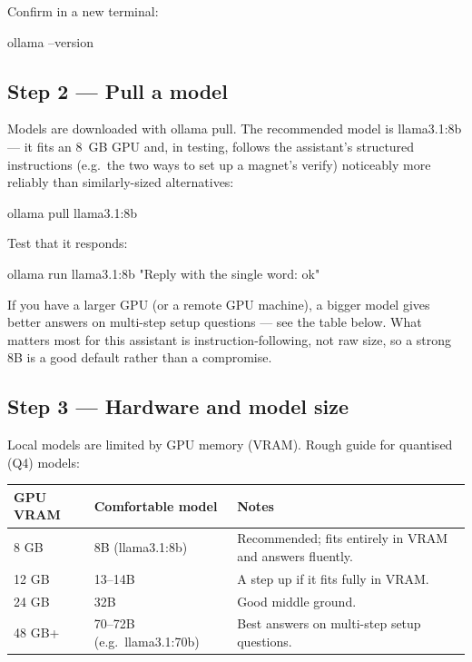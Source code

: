 \documentclass[11pt,a4paper]{article}
\newcommand{\code}[1]{{\ttfamily\color{qcode}#1}}
\begin{document}
Confirm in a new terminal:

\begin{cmd}
ollama --version
\end{cmd}

\subsection{Step 2 --- Pull a model}

Models are downloaded with \code{ollama pull}. The recommended model is
\code{llama3.1:8b} --- it fits an 8~GB GPU and, in testing, follows the
assistant's structured instructions (e.g.\ the two ways to set up a magnet's
verify) noticeably more reliably than similarly-sized alternatives:

\begin{cmd}
ollama pull llama3.1:8b
\end{cmd}

Test that it responds:

\begin{cmd}
ollama run llama3.1:8b "Reply with the single word: ok"
\end{cmd}

If you have a larger GPU (or a remote GPU machine), a bigger model gives
better answers on multi-step setup questions --- see the table below. What
matters most for this assistant is instruction-following, not raw size, so a
strong 8B is a good default rather than a compromise.

\subsection{Step 3 --- Hardware and model size}

Local models are limited by GPU memory (VRAM). Rough guide for quantised
(Q4) models:

\begin{center}\small
\begin{tabular}{@{}p{3.6cm}p{4.6cm}p{5.4cm}@{}}
\toprule
\textbf{GPU VRAM} & \textbf{Comfortable model} & \textbf{Notes} \\
\midrule
8 GB  & 8B (\code{llama3.1:8b}) & Recommended; fits entirely in VRAM and
  answers fluently. \\
12 GB & 13--14B & A step up if it fits fully in VRAM. \\
24 GB & 32B & Good middle ground. \\
48 GB+ & 70--72B (e.g.\ \code{llama3.1:70b}) & Best answers on
  multi-step setup questions. \\
\bottomrule
\end{tabular}
\end{center}
\end{document}
